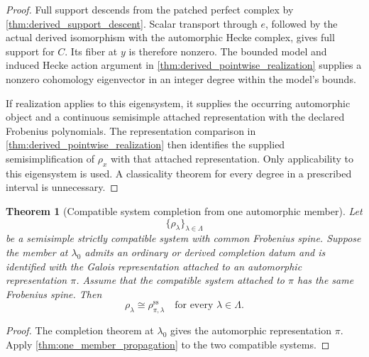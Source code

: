 \documentclass[11pt]{amsart}
\newtheorem{theorem}{Theorem}[section]
\theoremstyle{definition}
\theoremstyle{remark}
\begin{document}
\begin{proof}
Full support descends from the patched perfect complex by \cref{thm:derived_support_descent}. Scalar transport through \(e\), followed by the actual derived isomorphism with the automorphic Hecke complex, gives full support for \(C\). Its fiber at \(y\) is therefore nonzero. The bounded model and induced Hecke action argument in \cref{thm:derived_pointwise_realization} supplies a nonzero cohomology eigenvector in an integer degree within the model's bounds.

If realization applies to this eigensystem, it supplies the occurring automorphic object and a continuous semisimple attached representation with the declared Frobenius polynomials. The representation comparison in \cref{thm:derived_pointwise_realization} then identifies the supplied semisimplification of \(\rho_x\) with that attached representation. Only applicability to this eigensystem is used. A classicality theorem for every degree in a prescribed interval is unnecessary.
\end{proof}

\begin{theorem}[Compatible system completion from one automorphic member]\label{thm:system_completion}
Let
\[
\{\rho_\lambda\}_{\lambda\in\Lambda}
\]
be a semisimple strictly compatible system with common Frobenius spine. Suppose the member at \(\lambda_0\) admits an ordinary or derived completion datum and is identified with the Galois representation attached to an automorphic representation \(\pi\). Assume that the compatible system attached to \(\pi\) has the same Frobenius spine. Then
\[
\boxed{
\rho_\lambda
\cong
\rho_{\pi,\lambda}^{\mathrm{ss}}
\quad
\text{for every }\lambda\in\Lambda.
}
\]
\end{theorem}

\begin{proof}
The completion theorem at \(\lambda_0\) gives the automorphic representation \(\pi\). Apply \cref{thm:one_member_propagation} to the two compatible systems.
\end{proof}
\end{document}
